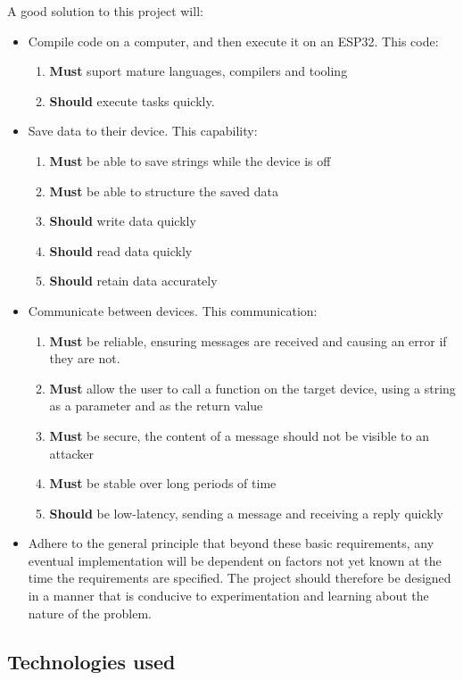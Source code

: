 \documentclass{article}
\begin{document}
A good solution to this project will:
\begin{itemize}
\item Compile code on a computer, and then execute it on an ESP32. This code:
\begin{enumerate}
  \item \textbf{Must} suport mature languages, compilers and tooling
  \item \textbf{Should} execute tasks quickly.
\end{enumerate}
\item Save data to their device. This capability:
\begin{enumerate}
  \item \textbf{Must} be able to save strings while the device is off
  \item \textbf{Must} be able to structure the saved data
  \item \textbf{Should} write data quickly
  \item \textbf{Should} read data quickly
  \item \textbf{Should} retain data accurately
\end{enumerate}
\item Communicate between devices. This communication:
\begin{enumerate}
  \item \textbf{Must} be reliable, ensuring messages are received and causing an error if they are not.
  \item \textbf{Must} allow the user to call a function on the target device, using a string as a parameter and as the return value
  \item \textbf{Must} be secure, the content of a message should not be visible to an attacker
  \item \textbf{Must} be stable over long periods of time
  \item \textbf{Should} be low-latency, sending a message and receiving a reply quickly
\end{enumerate}
\item Adhere to the general principle that beyond these basic requirements, any eventual implementation will be dependent on factors not yet known at the time the requirements are specified. The project should therefore be designed in a manner that is conducive to experimentation and learning about the nature of the problem.
\end{itemize}
\subsection{Technologies used}
\end{document}
